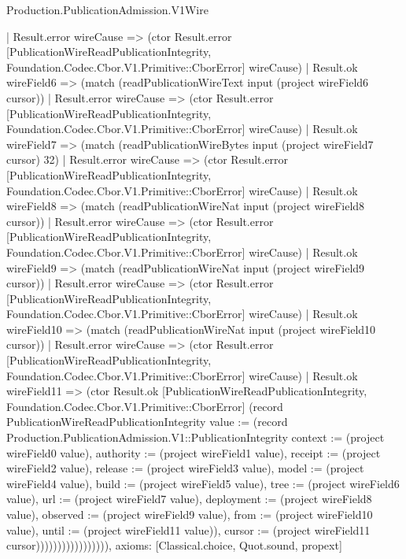 \begin{lexlean}{Production.PublicationAdmission.V1Wire}
\begin{semanticmodule}
{                    | Result.error wireCause => (ctor Result.error [PublicationWireReadPublicationIntegrity, Foundation.Codec.Cbor.V1.Primitive::CborError] wireCause)
                    | Result.ok wireField6 => (match (readPublicationWireText input (project wireField6 cursor))
                      | Result.error wireCause => (ctor Result.error [PublicationWireReadPublicationIntegrity, Foundation.Codec.Cbor.V1.Primitive::CborError] wireCause)
                      | Result.ok wireField7 => (match (readPublicationWireBytes input (project wireField7 cursor) 32)
                        | Result.error wireCause => (ctor Result.error [PublicationWireReadPublicationIntegrity, Foundation.Codec.Cbor.V1.Primitive::CborError] wireCause)
                        | Result.ok wireField8 => (match (readPublicationWireNat input (project wireField8 cursor))
                          | Result.error wireCause => (ctor Result.error [PublicationWireReadPublicationIntegrity, Foundation.Codec.Cbor.V1.Primitive::CborError] wireCause)
                          | Result.ok wireField9 => (match (readPublicationWireNat input (project wireField9 cursor))
                            | Result.error wireCause => (ctor Result.error [PublicationWireReadPublicationIntegrity, Foundation.Codec.Cbor.V1.Primitive::CborError] wireCause)
                            | Result.ok wireField10 => (match (readPublicationWireNat input (project wireField10 cursor))
                              | Result.error wireCause => (ctor Result.error [PublicationWireReadPublicationIntegrity, Foundation.Codec.Cbor.V1.Primitive::CborError] wireCause)
                              | Result.ok wireField11 => (ctor Result.ok [PublicationWireReadPublicationIntegrity, Foundation.Codec.Cbor.V1.Primitive::CborError] (record PublicationWireReadPublicationIntegrity {value := (record Production.PublicationAdmission.V1::PublicationIntegrity {context := (project wireField0 value), authority := (project wireField1 value), receipt := (project wireField2 value), release := (project wireField3 value), model := (project wireField4 value), build := (project wireField5 value), tree := (project wireField6 value), url := (project wireField7 value), deployment := (project wireField8 value), observed := (project wireField9 value), from := (project wireField10 value), until := (project wireField11 value)}), cursor := (project wireField11 cursor)})))))))))))))))),
  axioms: [Classical.choice, Quot.sound, propext]
}


\end{semanticmodule}
\end{lexlean}
